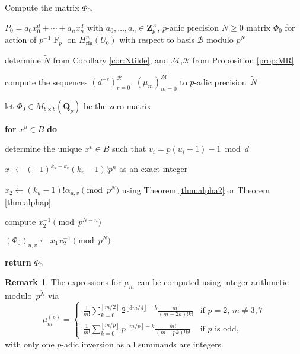 \documentclass[a4paper,11pt]{article}
\numberwithin{equation}{section}
\providecommand{\floor}[1]{\left\lfloor#1\right\rfloor}   %
\newcommand{\ZZ}{\mathbf{Z}} %
\newcommand{\QQ}{\mathbf{Q}} %
\DeclareMathOperator{\Frob}{F}           %
\providecommand{\Hrig}{H_{\text{rig}}}  %
\providecommand{\cB}{\mathcal{B}} %
\theoremstyle{definition}
\newtheorem{rem}[thm]{Remark}
\begin{document}
\begin{algorithm}
\caption{Compute the matrix $\Phi_0$.}
\label{alg:Diagfrob}
\begin{algorithmic}
\vspace{1mm}
\Require $P_0=a_0 x_0^d + \dotsb + a_n x_n^d$ 
         with $a_0,\dotsc,a_n \in \ZZ_p^{\times}$, 
         $p$-adic precision $N \geq 0$
\Ensure  matrix $\Phi_0$ for action of $p^{-1} \Frob_p$ on $\Hrig^n(U_0)$ with respect to basis $\cB$ modulo $p^N$
\State \begin{compactenum}[{\hspace{1em}} 1.] \vspace{-1.24em}
\item determine $\tilde{N}$ from Corollary \ref{cor:Ntilde}, and $\mathcal{M}$,$\mathcal{R}$ from Proposition \ref{prop:MR} 
\item compute the sequences $(d^{-r})_{r=0}^{\mathcal{R}}$, $(\mu_{m})_{m=0}^{\mathcal{M}}$ 
      to $p$-adic precision~$\tilde{N}$
\item let $\Phi_0 \in M_{b \times b}(\QQ_p)$ be the zero matrix
\item[] \textbf{for} $x^u \in B$ \textbf{do} 
\item[] \begin{compactenum}[{\hspace{1em}} 1.]
        \item determine the unique $x^v \in B$ such that $v_i = p (u_i + 1) - 1 \bmod{d}$
        \item $x_1 \gets (-1)^{k_u+k_v} (k_v-1)! p^n$ as an exact integer
        \item $x_2 \gets (k_u - 1)! \alpha_{u,v} \pmod{p^{\tilde{N}}}$ using Theorem \ref{thm:alpha2} or 
               Theorem \ref{thm:alphap}
        \item compute $x_2^{-1} \pmod{p^{N-n}}$
        \item $(\Phi_0)_{u,v} \gets x_1 x_2^{-1} \pmod{p^N}$
      \end{compactenum}   
 \item \textbf{return} $\Phi_0$      
\end{compactenum}
\EndProcedure
\end{algorithmic}
\end{algorithm}

\begin{rem} \label{rem:mup}
The expressions for $\mu_m$ can be computed using integer arithmetic 
modulo~$p^{\tilde{N}}$ via 
\begin{equation*}
\mu_m^{(p)} = \begin{cases}
\frac{1}{m!} \sum_{k=0}^{\floor{m/2}} 2^{\floor{3m/4} - k} \frac{m!}{(m-2k)! k!}
    & \text{if $p = 2$, $m \neq 3, 7$} \\
\frac{1}{m!} \sum_{k=0}^{\floor{m/p}} p^{\floor{m/p} - k} \frac{m!}{(m-pk)! k!}
    & \text{if $p$ is odd},
\end{cases}
\end{equation*}
with only one $p$-adic inversion as all summands are integers. 
\end{rem}
\end{document}
